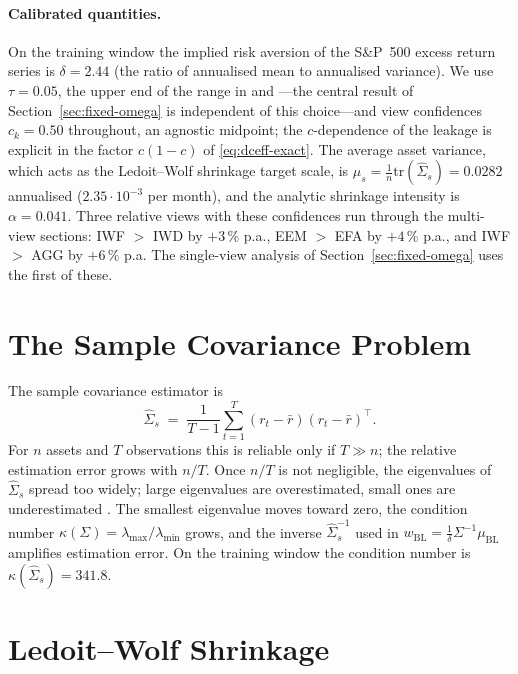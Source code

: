 \documentclass[a4paper,11pt]{article}
\theoremstyle{plain}
\theoremstyle{definition}
\newcommand{\muBL}{\mu_{\mathrm{BL}}}
\begin{document}
\paragraph{Calibrated quantities.}
On the training window the implied risk aversion of the S\&P~500 excess
return series is $\delta = 2.44$ (the ratio of annualised mean to
annualised variance). We use $\tau = 0.05$, the upper end of the range in
\citet{HeLitterman1999} and \citet{Idzorek2007}---the central result of
Section~\ref{sec:fixed-omega} is independent of this choice---and view
confidences $c_k = 0.50$ throughout, an agnostic midpoint; the
$c$-dependence of the leakage is explicit in the factor $c(1-c)$ of
\eqref{eq:dceff-exact}. The average asset variance, which
acts as the Ledoit--Wolf shrinkage target scale, is
$\mu_s = \tfrac{1}{n}\mathrm{tr}(\hat\Sigma_s) = 0.0282$ annualised
($2.35\cdot 10^{-3}$ per month), and the analytic shrinkage intensity is
$\alpha = 0.041$. Three relative views with these confidences run through
the multi-view sections: IWF $>$ IWD by $+3\,\%$ p.a., EEM $>$ EFA by
$+4\,\%$ p.a., and IWF $>$ AGG by $+6\,\%$ p.a. The single-view analysis
of Section~\ref{sec:fixed-omega} uses the first of these.

\section{The Sample Covariance Problem}
\label{sec:sample-problem}

The sample covariance estimator is
\[
  \hat\Sigma_s \;=\; \frac{1}{T-1}\sum_{t=1}^T (r_t - \bar r)(r_t - \bar r)^\top.
\]
For $n$ assets and $T$ observations this is reliable only if $T \gg n$;
the relative estimation error grows with $n/T$. Once $n/T$ is not
negligible, the eigenvalues of $\hat\Sigma_s$ spread
too widely; large eigenvalues are overestimated, small ones are
underestimated \citep[p.~371]{LedoitWolf2004}. The smallest eigenvalue
moves toward zero, the condition number
$\kappa(\Sigma) = \lambda_{\max}/\lambda_{\min}$ grows, and the inverse
$\hat\Sigma_s^{-1}$ used in
$w_{\mathrm{BL}} = \tfrac{1}{\delta}\Sigma^{-1}\muBL$ amplifies
estimation error. On the training window the condition number is
$\kappa(\hat\Sigma_s) = 341.8$.

\section{Ledoit--Wolf Shrinkage}
\label{sec:lw}
\end{document}

